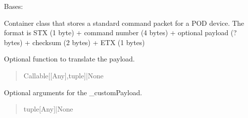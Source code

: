 \documentclass[letterpaper,10pt,english]{sphinxmanual}
\begin{document}
\begin{fulllineitems}
\label{\detokenize{PodApi.Packets:PodApi.Packets.Standard.PacketStandard}}
\pysigstartsignatures
{}
\pysigstopsignatures
\sphinxAtStartPar
Bases: {\hyperref[\detokenize{PodApi.Packets:PodApi.Packets.Packet.Packet}]{}}

\sphinxAtStartPar
Container class that stores a standard command packet for a POD device. The format is     STX (1 byte) + command number (4 bytes) + optional payload (? bytes) + checksum (2 bytes) + ETX (1 bytes)

\begin{fulllineitems}
\label{\detokenize{PodApi.Packets:PodApi.Packets.Standard.PacketStandard._customPayload}}
\pysigstartsignatures
{}
\pysigstopsignatures
\sphinxAtStartPar
Optional function to translate the payload.
\begin{quote}\begin{description}
\sphinxAtStartPar
Callable{[}{[}Any{]},tuple{]}|None

\end{description}\end{quote}

\end{fulllineitems}


\begin{fulllineitems}
\label{\detokenize{PodApi.Packets:PodApi.Packets.Standard.PacketStandard._customPayloadArgs}}
\pysigstartsignatures
{}
\pysigstopsignatures
\sphinxAtStartPar
Optional arguments for the \_customPayload.
\begin{quote}\begin{description}
\sphinxAtStartPar
tuple{[}Any{]}|None


\end{description}
\end{quote}
\end{fulllineitems}
\end{fulllineitems}
\end{document}
